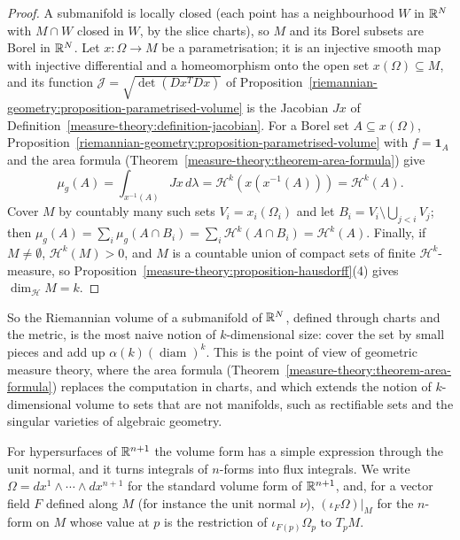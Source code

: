 \begin{proof}
A submanifold is locally closed (each point has a neighbourhood $W$ in $\mathbb{R}^N$ with $M \cap W$ closed in $W$, by the slice charts), so $M$ and its Borel subsets are Borel in $\mathbb{R}^N$. Let
$x \colon \Omega \to M$ be a parametrisation; it is an injective smooth map with injective differential and a homeomorphism onto the open set $x(\Omega) \subseteq M$, and its function
$\mathcal{J} = \sqrt{\det(Dx^TDx)}$ of Proposition~\ref{riemannian-geometry:proposition-parametrised-volume} is the Jacobian $Jx$ of Definition~\ref{measure-theory:definition-jacobian}. For a
Borel set $A \subseteq x(\Omega)$, Proposition~\ref{riemannian-geometry:proposition-parametrised-volume} with $f = \mathbf{1}_A$ and the area formula
(Theorem~\ref{measure-theory:theorem-area-formula}) give
\[
\mu_g(A) = \int_{x^{-1}(A)}Jx\,d\lambda = \mathcal{H}^k(x(x^{-1}(A))) = \mathcal{H}^k(A).
\]
Cover $M$ by countably many such sets $V_i = x_i(\Omega_i)$ and let $B_i = V_i \setminus \bigcup_{j < i}V_j$; then $\mu_g(A) = \sum_i\mu_g(A \cap B_i) = \sum_i\mathcal{H}^k(A \cap B_i) =
\mathcal{H}^k(A)$. Finally, if $M \neq \emptyset$, $\mathcal{H}^k(M) > 0$, and $M$ is a countable union of compact sets of finite $\mathcal{H}^k$-measure, so
Proposition~\ref{measure-theory:proposition-hausdorff}(4) gives $\dim_{\mathcal{H}}M = k$.
\end{proof}

So the Riemannian volume of a submanifold of $\mathbb{R}^N$, defined through charts and the metric, is the most naive notion of $k$-dimensional size: cover the set by small pieces and add up
$\alpha(k)(\operatorname{diam})^k$. This is the point of view of geometric measure theory, where the area formula (Theorem~\ref{measure-theory:theorem-area-formula}) replaces the computation in
charts, and which extends the notion of $k$-dimensional volume to sets that are not manifolds, such as rectifiable sets and the singular varieties of algebraic geometry.

For hypersurfaces of $\mathbb{R}^{n+1}$ the volume form has a simple expression through the unit normal, and it turns integrals of $n$-forms into flux integrals. We write
$\Omega = dx^1 \wedge \cdots \wedge dx^{n+1}$ for the standard volume form of $\mathbb{R}^{n+1}$, and, for a vector field $F$ defined along $M$ (for instance the unit normal
$\nu$), $(\iota_F\Omega)|_M$ for the $n$-form on $M$ whose value at $p$ is the restriction of $\iota_{F(p)}\Omega_p$ to $T_pM$.

